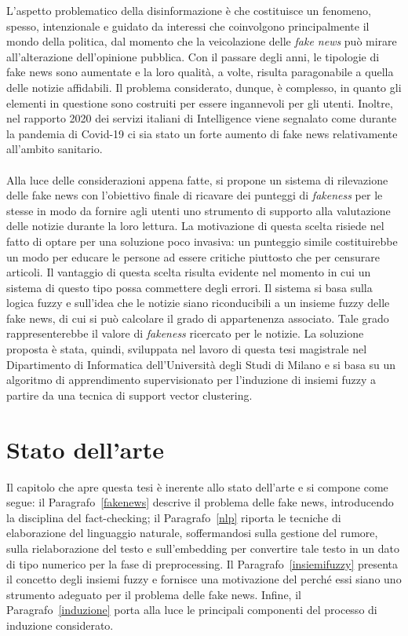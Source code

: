\documentclass[12pt]{report}
\theoremstyle{definition}
\begin{document}
L'aspetto problematico della disinformazione è che costituisce un fenomeno, spesso, intenzionale e guidato da interessi che coinvolgono principalmente il mondo della politica, dal momento che la veicolazione delle \textit{fake news} può mirare all'alterazione dell'opinione pubblica. 
Con il passare degli anni, le tipologie di fake news sono aumentate e la loro qualità, a volte, risulta paragonabile a quella delle notizie affidabili. Il problema considerato, dunque, è complesso, in quanto gli elementi in questione sono costruiti per essere ingannevoli per gli utenti.
Inoltre, nel rapporto 2020 dei servizi italiani di Intelligence viene segnalato come durante la pandemia di Covid-19 ci sia stato un forte aumento di fake news relativamente all'ambito sanitario.
\\
\\
Alla luce delle considerazioni appena fatte, si propone un sistema di rilevazione delle fake news con l'obiettivo finale di ricavare dei punteggi di \textit{fakeness} per le stesse in modo da fornire agli utenti uno strumento di supporto alla valutazione delle notizie durante la loro lettura.
La motivazione di questa scelta risiede nel fatto di optare per una soluzione poco invasiva: un punteggio simile costituirebbe un modo per educare le persone ad essere critiche piuttosto che per censurare articoli. Il vantaggio di questa scelta risulta evidente nel momento in cui un sistema di questo tipo possa commettere degli errori.
Il sistema si basa sulla logica fuzzy e sull'idea che le notizie siano riconducibili a un insieme fuzzy delle fake news, di cui si può calcolare il grado di appartenenza associato. Tale grado rappresenterebbe il valore di \textit{fakeness} ricercato per le notizie.
La soluzione proposta è stata, quindi, sviluppata nel lavoro di questa tesi magistrale nel Dipartimento di Informatica dell'Università degli Studi di Milano e si basa su un algoritmo di apprendimento supervisionato per l'induzione di insiemi fuzzy a partire da una tecnica di support vector clustering.

\chapter{Stato dell'arte}
\label{Capitolo 1}
\onehalfspacing

Il capitolo che apre questa tesi è inerente allo stato dell'arte e si compone come segue: il Paragrafo~\ref{fakenews} descrive il problema delle fake news, introducendo la disciplina del fact-checking; il Paragrafo~\ref{nlp} riporta le tecniche di elaborazione del linguaggio naturale, soffermandosi sulla gestione del rumore, sulla rielaborazione del testo e sull'embedding per convertire tale testo in un dato di tipo numerico per la fase di preprocessing. 
Il Paragrafo~\ref{insiemifuzzy} presenta il concetto degli insiemi fuzzy e fornisce una motivazione del perché essi siano uno strumento adeguato per il problema delle fake news.
Infine, il Paragrafo~\ref{induzione} porta alla luce le principali componenti del processo di induzione considerato.
\end{document}
